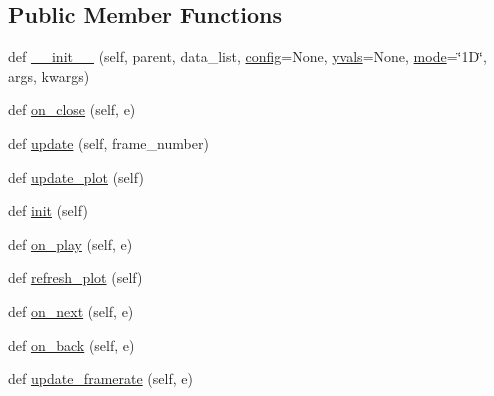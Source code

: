 \subsection*{Public Member Functions}
\begin{DoxyCompactItemize}
\item 
def \hyperlink{class_uni_dec_1_1unidec__modules_1_1_plot_animations_1_1_animation_window_a806e076b9f0a059efa71a340dec602c5}{\+\_\+\+\_\+init\+\_\+\+\_\+} (self, parent, data\+\_\+list, \hyperlink{class_uni_dec_1_1unidec__modules_1_1_plot_animations_1_1_animation_window_a9c33738b4b41b40c5fa5aab0e1623cd7}{config}=None, \hyperlink{class_uni_dec_1_1unidec__modules_1_1_plot_animations_1_1_animation_window_af8995df5d3e0c816ddce976803d29206}{yvals}=None, \hyperlink{class_uni_dec_1_1unidec__modules_1_1_plot_animations_1_1_animation_window_a4fd85e6b55eccfb80deef19b19adf3e2}{mode}=\char`\"{}1\+D\char`\"{}, args, kwargs)
\item 
def \hyperlink{class_uni_dec_1_1unidec__modules_1_1_plot_animations_1_1_animation_window_af98238c99135868ad17e3713a62a915d}{on\+\_\+close} (self, e)
\item 
def \hyperlink{class_uni_dec_1_1unidec__modules_1_1_plot_animations_1_1_animation_window_adfb2d11edabd6a3914eb1ee3d938c7e3}{update} (self, frame\+\_\+number)
\item 
def \hyperlink{class_uni_dec_1_1unidec__modules_1_1_plot_animations_1_1_animation_window_a27bf8089f1f85d4b2cbdbce34d880230}{update\+\_\+plot} (self)
\item 
def \hyperlink{class_uni_dec_1_1unidec__modules_1_1_plot_animations_1_1_animation_window_a032cc6e24a7f1c17cf42899f9b294ad8}{init} (self)
\item 
def \hyperlink{class_uni_dec_1_1unidec__modules_1_1_plot_animations_1_1_animation_window_a548589017a9270cf59ad2c99c1969c51}{on\+\_\+play} (self, e)
\item 
def \hyperlink{class_uni_dec_1_1unidec__modules_1_1_plot_animations_1_1_animation_window_a6deaa5e0075740af1b3d73fa37018a03}{refresh\+\_\+plot} (self)
\item 
def \hyperlink{class_uni_dec_1_1unidec__modules_1_1_plot_animations_1_1_animation_window_afe88307b0358eeff278da8109ec56ca4}{on\+\_\+next} (self, e)
\item 
def \hyperlink{class_uni_dec_1_1unidec__modules_1_1_plot_animations_1_1_animation_window_a1068195cd50e847f9aa1b71c62414290}{on\+\_\+back} (self, e)
\item 
def \hyperlink{class_uni_dec_1_1unidec__modules_1_1_plot_animations_1_1_animation_window_a21dd1b45ace7a65f8ebd4868b453bef1}{update\+\_\+framerate} (self, e)
\end{DoxyCompactItemize}
